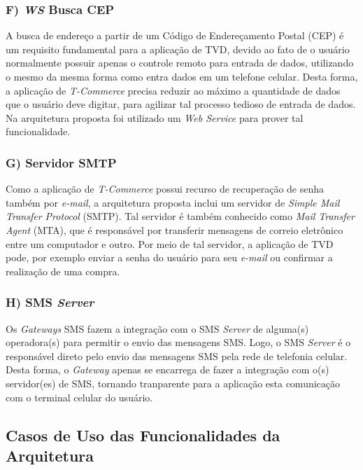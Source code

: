 \subsubsection*{F) \textit{WS} Busca CEP}

A busca de endereço a partir de um Código de Endereçamento Postal (CEP) 
é um requisito fundamental para
a aplicação de TVD, devido ao fato de o usuário
normalmente possuir apenas o controle remoto para entrada
de dados, utilizando o mesmo da mesma forma
como entra dados em um telefone celular.
Desta forma, a aplicação de \textit{T-Commerce} precisa
reduzir ao máximo a quantidade de dados que o usuário deve
digitar, para agilizar tal processo tedioso de entrada
de dados. Na arquitetura proposta foi utilizado um \textit{Web Service} para prover tal funcionalidade.

\subsubsection*{G) Servidor SMTP}

Como a aplicação de \textit{T-Commerce} possui recurso de recuperação de senha também por \textit{e-mail},
a arquitetura proposta inclui um servidor de \textit{Simple Mail Transfer Protocol} (SMTP).
Tal servidor é também conhecido como \textit{Mail Transfer Agent} (MTA),
que é responsável por transferir mensagens de correio eletrônico entre um computador e outro.
Por meio de tal servidor, a aplicação de TVD pode, por exemplo enviar a senha do usuário para seu \textit{e-mail}
ou confirmar a realização de uma compra.

\subsubsection*{H) SMS \textit{Server}}

Os \textit{Gateways} SMS fazem a integração com o SMS \textit{Server} de alguma(s) operadora(s)
para permitir o envio das mensagens SMS. 
Logo, o SMS \textit{Server} é o responsável direto pelo envio
das mensagens SMS pela rede de telefonia celular. Desta forma, o \textit{Gateway} apenas 
se encarrega de fazer a integração com o(s) servidor(es) de SMS, tornando tranparente para a aplicação
esta comunicação com o terminal celular do usuário.

\subsection{Casos de Uso das Funcionalidades da Arquitetura}

